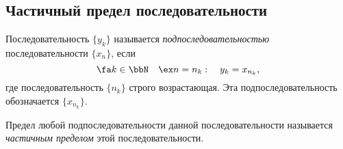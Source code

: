 \subsection{Частичный предел последовательности}
\begin{defn}
Последовательность $\{y_k\}$ называется \textit{подпоследовательностью} последовательности $\{x_n\}$, если 
$$
\fa k \in \bbN \quad \ex n=n_k:\quad y_k=x_{n_k},
$$
где последовательность $\{n_k\}$ строго возрастающая. Эта подпоследовательность обозначается $\{x_{n_k}\}$.
\end{defn}

\begin{defn}
Предел любой подпоследовательности данной последовательности называется \textit{частичным пределом} этой последовательности.
\end{defn}

